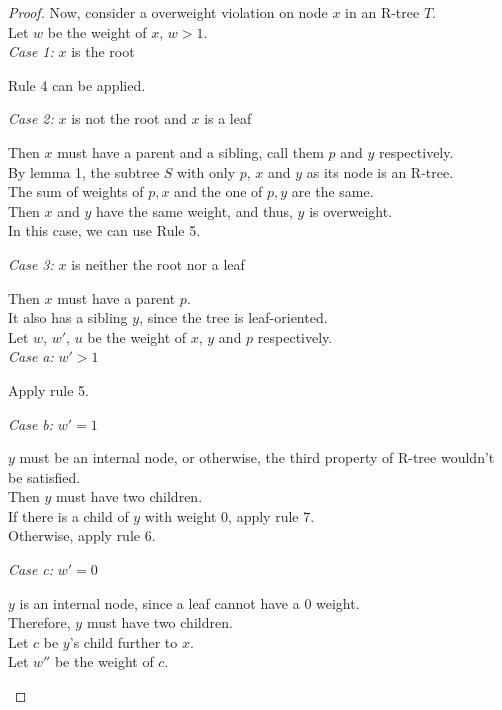 \documentclass[10pt]{article}
\begin{document}
\begin{enumerate}
\begin{proof}
	Now, consider a overweight violation on node $x$ in an R-tree $T$. \\
	Let $w$ be the weight of $x$, $w > 1$. \\
	\textit{Case 1:} $x$ is the root
	\begin{addmargin}[1em]{0em}
		Rule 4 can be applied.
	\end{addmargin}
	\textit{Case 2:} $x$ is not the root and $x$ is a leaf
	\begin{addmargin}[1em]{0em}
		Then $x$ must have a parent and a sibling, call them $p$ and $y$
		respectively. \\
		By lemma 1, the subtree $S$ with only $p$, $x$ and $y$ as its node is
		an R-tree. \\
		The sum of weights of $p,x$ and the one of $p,y$ are the same. \\
		Then $x$ and $y$ have the same weight, and thus, $y$ is overweight. \\
		In this case, we can use Rule 5.
	\end{addmargin}
	\textit{Case 3:} $x$ is neither the root nor a leaf
	\begin{addmargin}[1em]{0em}
		Then $x$ must have a parent $p$. \\
		It also has a sibling $y$, since the tree is leaf-oriented. \\
		Let $w$, $w'$, $u$ be the weight of $x$, $y$ and $p$ respectively. \\
		\textit{Case a:} $w' > 1$
		\begin{addmargin}[1em]{0em}
			Apply rule 5.
		\end{addmargin}
		\textit{Case b:} $w' = 1$
		\begin{addmargin}[1em]{0em}
			$y$ must be an internal node, or otherwise, the third property of
			R-tree wouldn't be satisfied. \\
			Then $y$ must have two children. \\
			If there is a child of $y$ with weight 0, apply rule 7. \\
			Otherwise, apply rule 6.
		\end{addmargin}
		\textit{Case c:} $w' = 0$
		\begin{addmargin}[1em]{0em}
			$y$ is an internal node, since a leaf cannot have a 0 weight. \\
			Therefore, $y$ must have two children. \\
			Let $c$ be $y$'s child further to $x$. \\
			Let $w''$ be the weight of $c$. \\

\end{addmargin}
\end{addmargin}
\end{proof}
\end{enumerate}
\end{document}
